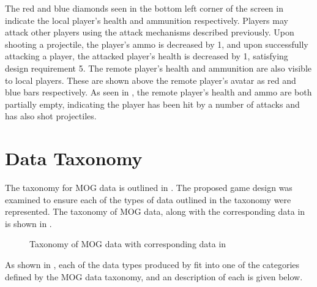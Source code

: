 The red and blue diamonds seen in the bottom left corner of the screen in  indicate the local player's health and ammunition respectively. Players may attack other players using the attack mechanisms described previously. Upon shooting a projectile, the player's ammo is decreased by 1, and upon successfully attacking a player, the attacked player's health is decreased by 1, satisfying design requirement 5. The remote player's health and ammunition are also visible to local players. These are shown above the remote player's avatar as red and blue bars respectively. As seen in , the remote player's health and ammo are both partially empty, indicating the player has been hit by a number of attacks and has also shot projectiles.

\section{\game{} Data Taxonomy}
The taxonomy for MOG data is outlined in . The proposed game design was examined to ensure each of the types of data outlined in the taxonomy were represented. The taxonomy of MOG data, along with the corresponding data in \game{} is shown in .

\begin{figure}[H]
    \centering
    \caption{Taxonomy of MOG data with corresponding data in \game{}}
    \label{fig:des:taxonomy-with-data}
\end{figure}

As shown in , each of the data types produced by \game{} fit into one of the categories defined by the MOG data taxonomy, and an description of each is given below.

